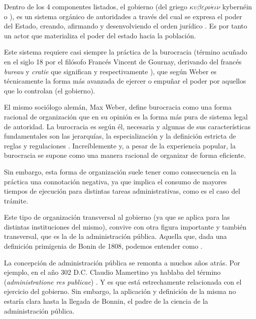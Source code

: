 Dentro de los 4 componentes listados, el gobierno (del griego
$\kappa \upsilon \beta \varepsilon \rho \nu \acute{\epsilon} \iota \nu$
kybernéin  o ), es un
sistema orgánico de autoridades a través del cual se expresa el poder del
Estado, creando, afirmando y desenvolviendo el orden jurídico
\cite{fernandezruizDerechoParlamentario2023}. Es por tanto un actor que
materializa el poder del estado hacia la población.

Este sistema requiere casi siempre la práctica de la burocracia (término acuñado en el siglo 18 por el filósofo Francés Vincent de
Gournay, derivando del francés \textit{bureau} y \textit{cratie} que significan
 y  respectivamente
\cite{rockmanBureaucracyStructureProcesses2024}), que según Weber es técnicamente la forma más avanzada de ejercer o empuñar el poder por aquellos que lo controlan \cite[114]{watersWeberRationalismModern2015} (el gobierno). 

El mismo sociólogo alemán, Max Weber, define burocracia como una forma racional de
organización que en su opinión es la forma más pura de sistema legal de
autoridad. La burocracia es según él, necesaria y algunas de sus características
fundamentales son las jerarquías, la especialización y la definición estricta
de reglas y regulaciones \cite{archerDictionaryPublicAdministration2022}. Increíblemente y, a pesar de la experiencia popular, la burocracia se supone como una manera racional de organizar de forma eficiente.

Sin embargo, esta forma de organización suele tener como consecuencia en la
práctica una connotación negativa, ya que implica el consumo de mayores tiempos
de ejecución para distintas tareas administrativas, como es el caso del trámite.

Este tipo de organización transversal al gobierno (ya que se aplica para las distintas instituciones del mismo), convive con otra figura importante y también transversal, que es la de la administración pública. Aquella que, dada una definición primigenia de Bonin de 1808, podemos entender como  \cite{guerreroCharlesJeanBonninSiglo2020}.

La concepción de administración pública se remonta a muchos años atrás. Por
ejemplo, en el año 302 D.C. Claudio Mamertino ya hablaba del término
 (\textit{administratione res publicae})
\cite{nixonPraiseLaterRoman1994}. Y es que está estrechamente relacionada con el
ejercicio del gobierno. Sin embargo, la aplicación y definición de la misma no
estaría clara hasta la llegada de Bonnin, el padre de la ciencia de la
administración pública.

